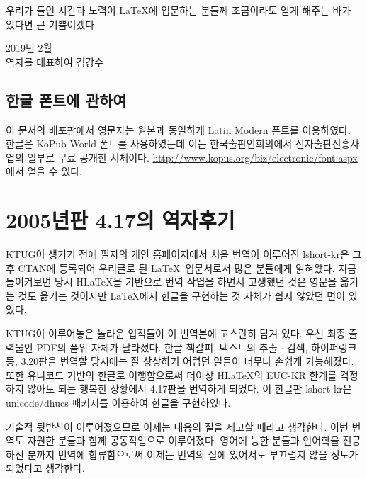 우리가 들인 시간과 노력이 \LaTeX 에 입문하는 분들께 조금이라도 얻게 해주는 바가 있다면 
큰 기쁨이겠다.

\bigskip
{\flushright 2019년 2월 \\
역자를 대표하여 김강수 \par
}

\subsection*{한글 폰트에 관하여}

이 문서의 배포판에서 영문자는 원본과 동일하게 Latin Modern 폰트를 이용하였다.
한글은 KoPub World 폰트를 사용하였는데 이는 한국출판인회의에서 전자출판진흥사업의 일부로 
무료 공개한 서체이다. \url{http://www.kopus.org/biz/electronic/font.aspx}에서 
얻을 수 있다.

\section*{2005년판 4.17의 역자후기}

KTUG이 생기기 전에 필자의 개인 홈페이지에서 처음 번역이 이루어진 lshort-kr은
그 후 CTAN에 등록되어 우리글로 된 \LaTeX\ 입문서로서 많은 분들에게 읽혀왔다.
지금 돌이켜보면 당시 H\LaTeX 을 기반으로 번역 작업을 하면서 고생했던 것은
영문을 옮기는 것도 옮기는 것이지만 \LaTeX 에서 한글을 구현하는 것 자체가
쉽지 않았던 면이 있었다.

KTUG이 이루어놓은 놀라운 업적들이 이 번역본에 고스란히 담겨 있다. 우선 
최종 출력물인 PDF의 품위 자체가 달라졌다. 한글 책갈피, 텍스트의 추출 $\cdot$
검색, 하이퍼링크 등, 3.20판을 번역할 당시에는 잘 상상하기 어렵던 일들이
너무나 손쉽게 가능해졌다. 또한 유니코드 기반의 한글로 이행함으로써
더이상 H\LaTeX 의 EUC-KR 한계를 걱정하지 않아도 되는 행복한 상황에서
4.17판을 번역하게 되었다. 이 한글판 lshort-kr은 \textsf{unicode/dhucs} 패키지를
이용하여 한글을 구현하였다.

기술적 뒷받침이 이루어졌으므로 이제는 내용의 질을 제고할 때라고 생각한다.
이번 번역도 자원한 분들과 함께 공동작업으로 이루어졌다. 영어에 능한
분들과 언어학을 전공하신 분까지 번역에 합류함으로써 이제는 번역의 질에
있어서도 부끄럽지 않을 정도가 되었다고 생각한다.

